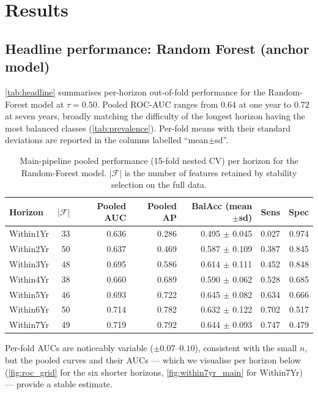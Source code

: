 \documentclass[11pt,a4paper]{article}
\providecommand{\Cref}[1]{\autoref{#1}}
\begin{document}
\section{Results}
\label{sec:results}

\subsection{Headline performance: Random Forest (anchor model)}
\Cref{tab:headline} summarises per-horizon out-of-fold performance for
the Random-Forest model at $\tau=0.50$. Pooled ROC-AUC ranges from
$0.64$ at one year to $0.72$ at seven years, broadly matching the
difficulty of the longest horizon having the most balanced classes
(\Cref{tab:prevalence}). Per-fold means with their standard deviations
are reported in the columns labelled ``mean$\pm$sd''.

\begin{table}[h]
\centering
\caption{Main-pipeline pooled performance (15-fold nested CV) per horizon
for the Random-Forest model. \textit{$|\mathcal{F}|$} is the number of
features retained by stability selection on the full data.}
\label{tab:headline}
\small
\begin{tabular}{lrrrrrr}
\toprule
Horizon & $|\mathcal{F}|$ & Pooled AUC & Pooled AP & BalAcc (mean$\pm$sd) & Sens & Spec \\
\midrule
Within1Yr & 33 & 0.636 & 0.286 & 0.495 $\pm$ 0.045 & 0.027 & 0.974 \\
Within2Yr & 50 & 0.637 & 0.469 & 0.587 $\pm$ 0.109 & 0.387 & 0.845 \\
Within3Yr & 48 & 0.695 & 0.586 & 0.614 $\pm$ 0.111 & 0.452 & 0.848 \\
Within4Yr & 38 & 0.660 & 0.689 & 0.590 $\pm$ 0.062 & 0.528 & 0.685 \\
Within5Yr & 46 & 0.693 & 0.722 & 0.645 $\pm$ 0.082 & 0.634 & 0.666 \\
Within6Yr & 50 & 0.714 & 0.782 & 0.632 $\pm$ 0.122 & 0.702 & 0.517 \\
Within7Yr & 49 & 0.719 & 0.792 & 0.644 $\pm$ 0.093 & 0.747 & 0.479 \\
\bottomrule
\end{tabular}
\end{table}

Per-fold AUCs are noticeably variable
($\pm 0.07$--$0.10$), consistent with the small $n$, but the pooled
curves and their AUCs --- which we visualise per horizon below
(\Cref{fig:roc_grid} for the six shorter horizons,
\Cref{fig:within7yr_main} for Within7Yr) --- provide a stable estimate.
\end{document}
